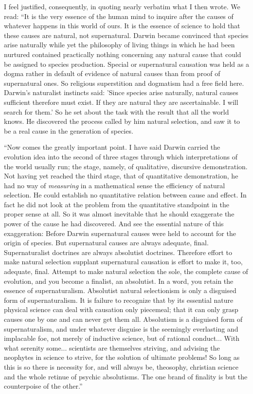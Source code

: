 \documentclass[a4paper, 11pt, oneside, polutonikogreek, english, landscape]{article}
\begin{document}
I feel justified, consequently, in quoting nearly verbatim what I then wrote. We read: ``It is the very essence of the human mind to inquire after the causes of whatever happens in this world of ours. It is the essence of science to hold that these causes are natural, not supernatural. Darwin became convinced that species arise naturally while yet the philosophy of living things in which he had been nurtured contained practically nothing concerning any natural cause that could be assigned to species production. Special or supernatural causation was held as a dogma rather in default of evidence of natural causes than from proof of supernatural ones. So religious superstition and dogmatism had a free field here. Darwin's naturalist instincts said: 'Since species arise naturally, natural causes sufficient therefore must exist. If they are natural they are ascertainable. I will search for them.' So he set about the task with the result that all the world knows. He discovered the process called by him natural selection, and saw it to be a real cause in the generation of species.

``Now comes the greatly important point. I have said Darwin carried the evolution idea into the second of three stages through which interpretations of the world usually run; the stage, namely, of qualitative, discursive demonstration. Not having yet reached the third stage, that of quantitative demonstration, he had no way of \emph{measuring} in a mathematical sense the efficiency of natural selection. He could establish no quantitative relation between cause and effect. In fact he did not look at the problem from the quantitative standpoint in the proper sense at all. So it was almost inevitable that he should exaggerate the power of the cause he had discovered. And see the essential nature of this exaggeration: Before Darwin supernatural causes were held to account for the origin of species. But supernatural causes are always adequate, final. Supernaturalist doctrines are always absolutist doctrines. Therefore effort to make natural selection supplant supernatural causation is effort to make it, too, adequate, final. Attempt to make natural selection the sole, the complete cause of evolution, and you become a finalist, an absolutist. In a word, you retain the essence of supernaturalism. Absolutist natural selectionism is only a disguised form of supernaturalism. It is failure to recognize that by its essential nature physical science can deal with causation only piecemeal; that it can only grasp causes one by one and can never get them all. Absolutism is a disguised form of supernaturalism, and under whatever disguise is the seemingly everlasting and implacable foe, not merely of inductive science, but of rational conduct... With what serenity some... scientists are themselves striving, and advising the neophytes in science to strive, for the solution of ultimate problems! So long as this is so there is necessity for, and will always be, theosophy, christian science and the whole retinue of psychic absolutisms. The one brand of finality is but the counterpoise of the other.''
\end{document}
